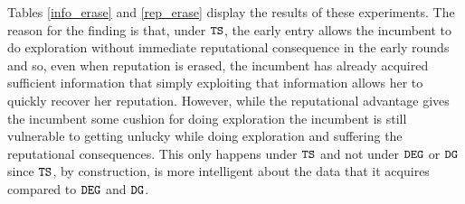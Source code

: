 \documentclass[../competing_bandits.tex]{subfiles}
\begin{document}
Tables \ref{info_erase} and \ref{rep_erase} display the results of these experiments. The reason for the finding is that, under $\mathtt{TS}$, the early entry allows the incumbent to do exploration without immediate reputational consequence in the early rounds and so, even when reputation is erased, the incumbent has already acquired sufficient information that simply exploiting that information allows her to quickly recover her reputation. However, while the reputational advantage gives the incumbent some cushion for doing exploration the incumbent is still vulnerable to getting unlucky while doing exploration and suffering the reputational consequences. This only happens under $\mathtt{TS}$ and not under $\mathtt{DEG}$ or $\mathtt{DG}$ since $\mathtt{TS}$, by construction, is more intelligent about the data that it acquires compared to $\mathtt{DEG}$ and $\mathtt{DG}$.

\end{document}
